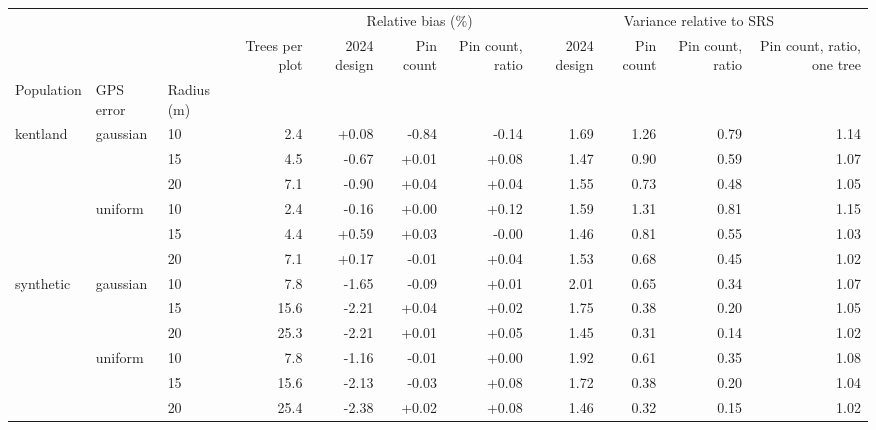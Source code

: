 \begin{tabular}{lll|r|rrr|rrrr}
\toprule
 &  &  &  & \multicolumn{3}{c}{Relative bias (\%)} & \multicolumn{4}{c}{Variance relative to SRS} \\
 &  &  & Trees per plot & 2024 design & Pin count & Pin count, ratio & 2024 design & Pin count & Pin count, ratio & Pin count, ratio, one tree \\
Population & GPS error & Radius (m) &  &  &  &  &  &  &  &  \\
\midrule
\multirow[t]{6}{*}{kentland} & \multirow[t]{3}{*}{gaussian} & 10 & 2.4 & +0.08 & -0.84 & -0.14 & 1.69 & 1.26 & 0.79 & 1.14 \\
 &  & 15 & 4.5 & -0.67 & +0.01 & +0.08 & 1.47 & 0.90 & 0.59 & 1.07 \\
 &  & 20 & 7.1 & -0.90 & +0.04 & +0.04 & 1.55 & 0.73 & 0.48 & 1.05 \\
\cline{2-11}
 & \multirow[t]{3}{*}{uniform} & 10 & 2.4 & -0.16 & +0.00 & +0.12 & 1.59 & 1.31 & 0.81 & 1.15 \\
 &  & 15 & 4.4 & +0.59 & +0.03 & -0.00 & 1.46 & 0.81 & 0.55 & 1.03 \\
 &  & 20 & 7.1 & +0.17 & -0.01 & +0.04 & 1.53 & 0.68 & 0.45 & 1.02 \\
\cline{1-11} \cline{2-11}
\multirow[t]{6}{*}{synthetic} & \multirow[t]{3}{*}{gaussian} & 10 & 7.8 & -1.65 & -0.09 & +0.01 & 2.01 & 0.65 & 0.34 & 1.07 \\
 &  & 15 & 15.6 & -2.21 & +0.04 & +0.02 & 1.75 & 0.38 & 0.20 & 1.05 \\
 &  & 20 & 25.3 & -2.21 & +0.01 & +0.05 & 1.45 & 0.31 & 0.14 & 1.02 \\
\cline{2-11}
 & \multirow[t]{3}{*}{uniform} & 10 & 7.8 & -1.16 & -0.01 & +0.00 & 1.92 & 0.61 & 0.35 & 1.08 \\
 &  & 15 & 15.6 & -2.13 & -0.03 & +0.08 & 1.72 & 0.38 & 0.20 & 1.04 \\
 &  & 20 & 25.4 & -2.38 & +0.02 & +0.08 & 1.46 & 0.32 & 0.15 & 1.02 \\
\cline{1-11} \cline{2-11}
\bottomrule
\end{tabular}
